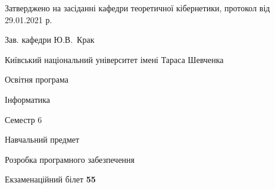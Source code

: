\documentclass[10pt, ukrainian]{article}
\begin{document}
{\vspace{5mm}\smallskip \begin {small} Затверджено на засіданні кафедри теоретичної кібернетики, протокол  від   29.01.2021 р.\par\smallskip\smallskip
{\parbox {6.5 cm}{Зав. кафедри \dotfill Ю.В.~Крак}} \end{small}}
\newpage

{{\begin {small}\par
{ \center  Київський національний університет імені Тараса Шевченка \par}
{\parbox {5 cm}{Освітня програма \hfill}{\parbox {7 cm}{Інформатика \hfill}}\parbox {6 cm}{\hfill Семестр 6}}\par
{\parbox {5 cm} {Навчальний предмет \hfill}\parbox {7 cm}{Розробка програмного забезпечення \hfill}\parbox {6cm}{\hfill}\par}\vspace{-7pt} \end{small}}{\center Екзаменаційний білет \No \textbf
{ 55 }\par}}
\end{document}

